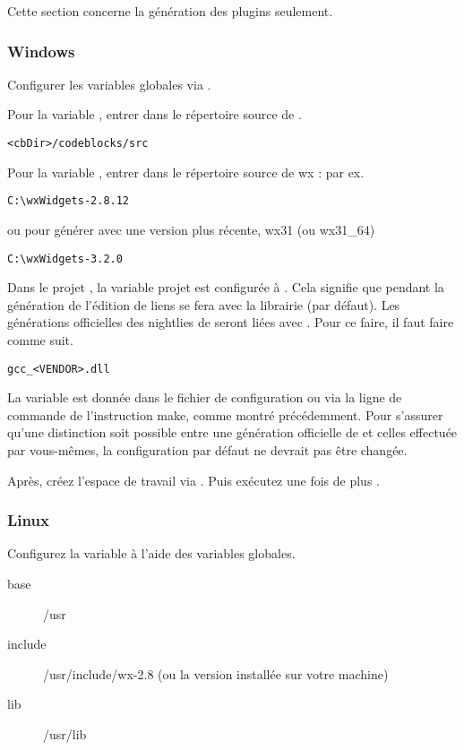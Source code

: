 Cette section concerne la génération des plugins seulement.

\subsubsection{Windows}

Configurer les variables globales via .


Pour la variable , entrer dans  le répertoire source de \codeblocks.

\begin{verbatim}
<cbDir>/codeblocks/src
\end{verbatim}


Pour la variable , entrer dans  le répertoire source de wx : par ex.

\begin{verbatim}
C:\wxWidgets-2.8.12
\end{verbatim}

ou pour générer avec une version plus récente, wx31 (ou wx31\_64)

\begin{verbatim}
C:\wxWidgets-3.2.0
\end{verbatim}

Dans le projet \codeblocks, la variable projet  est configurée à . Cela signifie que pendant la génération de \codeblocks l'édition de liens se fera avec la librairie  (par défaut). Les générations officielles des nightlies de \codeblocks seront liées avec . Pour ce faire, il faut faire comme suit.

\begin{verbatim}
gcc_<VENDOR>.dll
\end{verbatim}

La variable  est donnée dans le fichier de configuration  ou via la ligne de commande de l'instruction make, comme montré précédemment. Pour s'assurer qu'une distinction soit possible entre une génération officielle de \codeblocks et celles effectuée par vous-mêmes, la configuration par défaut  ne devrait pas être changée.

Après, créez l'espace de travail  via . Puis exécutez une fois de plus .

\subsubsection{Linux}

Configurez la variable  à l'aide des variables globales.

\begin{description}
\item[base] /usr
\item[include] /usr/include/wx-2.8 (ou la version installée sur votre machine)
\item[lib] /usr/lib
\end{description}


